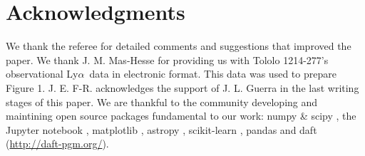 \documentclass[a4paper,fleqn,usenatbib]{mnras}
\newcommand{\tol}{Tololo 1214-277}
\newcommand{\lya}{\ifmmode{{\rm Ly}\alpha}\else Ly$\alpha$\ \fi}
\begin{document}
\section*{Acknowledgments}
We thank the referee for detailed comments and suggestions that
improved the paper. 
We thank J. M. Mas-Hesse for providing us with \tol's observational
\lya data \citep{mashesse03} in electronic format. This data was
used to prepare Figure 1.
J. E. F-R. acknowledges the support of J. L. Guerra in the last
writing stages of this paper.
We are thankful to the community developing and maintining open source
packages fundamental to our work: numpy \& scipy \citep{numpy}, the
Jupyter notebook \citep{IPython,jupyter}, matplotlib
\citep{matplotlib}, astropy \citep{astropy},  scikit-learn
\citep{scikit-learn}, pandas \citep{pandas} and daft
(\url{http://daft-pgm.org/}).  
\end{document}
